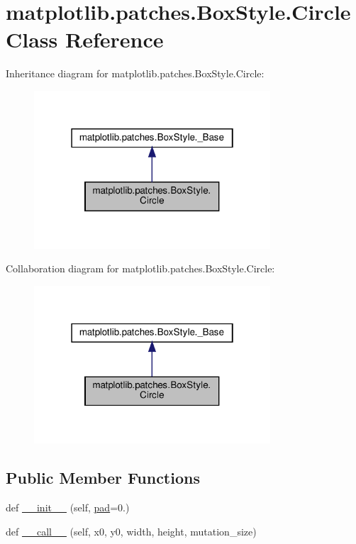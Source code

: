 \hypertarget{classmatplotlib_1_1patches_1_1BoxStyle_1_1Circle}{}\section{matplotlib.\+patches.\+Box\+Style.\+Circle Class Reference}
\label{classmatplotlib_1_1patches_1_1BoxStyle_1_1Circle}


Inheritance diagram for matplotlib.\+patches.\+Box\+Style.\+Circle\+:
\nopagebreak
\begin{figure}[H]
\begin{center}
\leavevmode
\includegraphics[width=250pt]{classmatplotlib_1_1patches_1_1BoxStyle_1_1Circle__inherit__graph}
\end{center}
\end{figure}


Collaboration diagram for matplotlib.\+patches.\+Box\+Style.\+Circle\+:
\nopagebreak
\begin{figure}[H]
\begin{center}
\leavevmode
\includegraphics[width=250pt]{classmatplotlib_1_1patches_1_1BoxStyle_1_1Circle__coll__graph}
\end{center}
\end{figure}
\subsection*{Public Member Functions}
\begin{DoxyCompactItemize}
\item 
def \hyperlink{classmatplotlib_1_1patches_1_1BoxStyle_1_1Circle_a12275b37eb3f400c83ba494550ac4a49}{\+\_\+\+\_\+init\+\_\+\+\_\+} (self, \hyperlink{classmatplotlib_1_1patches_1_1BoxStyle_1_1Circle_ac264f4bb6e9af501cd9b9095f985b546}{pad}=0.)
\item 
def \hyperlink{classmatplotlib_1_1patches_1_1BoxStyle_1_1Circle_a39e1b1fd380c5218000926bff885eea6}{\+\_\+\+\_\+call\+\_\+\+\_\+} (self, x0, y0, width, height, mutation\+\_\+size)
\end{DoxyCompactItemize}
